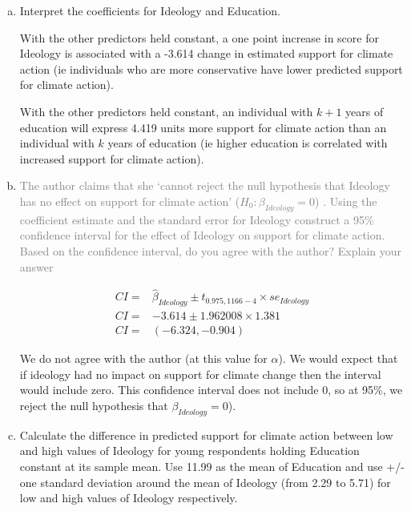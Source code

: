 \documentclass[12pt,letterpaper]{article}
\begin{document}
\begin{enumerate}[(a)]
	
	\item Interpret the coefficients for Ideology and Education.
	
	With the other predictors held constant, a one point increase in score for Ideology is associated with a -3.614 change in estimated support for climate action (ie individuals who are more conservative have lower predicted support for climate action).

  With the other predictors held constant, an individual  with $k+1$ years of education will express 4.419 units more support for climate action than an individual with $k$ years of education (ie higher education is correlated with increased support for climate action).
  	
	\item \textcolor{gray}{The author claims that she `cannot reject the null hypothesis that Ideology has no effect on support for climate action' ($H_0 : \beta_{Ideology} = 0$) . Using the coefficient estimate
and the standard error for Ideology construct a 95\% confidence interval for the effect of
Ideology on support for climate action. Based on the confidence interval, do you agree
with the author? Explain your answer}

  \begin{align*}
    CI = &  \hat{\beta}_{Ideology} \pm t_{0.975, 1166-4} \times se_{Ideology} \\
    CI = & -3.614 \pm 1.962008 \times 1.381 \\
    CI = & (-6.324, -0.904)
   \end{align*}

  We do not agree with the author (at this value for $\alpha$).  We would expect that if ideology had no impact on support for climate change then the interval would include zero.
  This confidence interval does not include 0, so at 95\%, we reject the null hypothesis that $\beta_{Ideology} = 0$).  
  

	 
  
  \item Calculate the difference in predicted support for climate action between low and high values of Ideology for young respondents holding Education constant at its sample mean.
Use 11.99 as the mean of Education and use +/- one standard deviation around the
mean of Ideology (from 2.29 to 5.71) for low and high values of Ideology respectively.


\end{enumerate}
\end{document}
